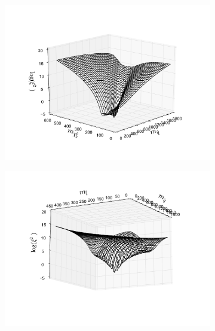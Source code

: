 \documentclass[twoside,english]{uiofysmaster}
\begin{document}
\begin{figure}[hbt]
	\centering
	\begin{subfigure}[b]{0.49\textwidth}
		\includegraphics[width=\textwidth]{figures/3D_plot_xisquared_25_herwig_events_with_combinatorics_squark-chi2.pdf} 
		\caption{}
		\label{fig:3D_masses_with_combinatorics1}
	\end{subfigure}
	\begin{subfigure}[b]{0.49\textwidth}
		\includegraphics[width=\textwidth]{figures/3D_plot_xisquared_25_herwig_events_with_combinatorics_squark-slepton.pdf} 
		\caption{}
		\label{fig:3D_masses_with_combinatorics2}
	\end{subfigure}


\end{figure}
\end{document}
